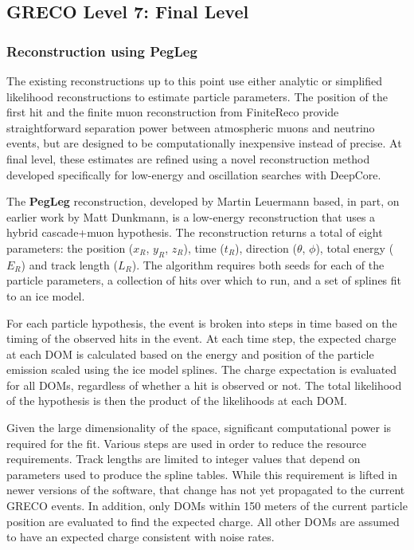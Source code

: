 \subsection{GRECO Level 7: Final Level}

\label{subsec:pegleg_reco}
\subsubsection{Reconstruction using PegLeg}
The existing reconstructions up to this point use either analytic or simplified likelihood reconstructions to estimate particle parameters.
The position of the first hit and the finite muon reconstruction from FiniteReco provide straightforward separation power between atmospheric muons and neutrino events, but are designed to be computationally inexpensive instead of precise.
At final level, these estimates are refined using a novel reconstruction method developed specifically for low-energy and oscillation searches with DeepCore.

The \textbf{PegLeg} reconstruction, developed by Martin Leuermann based, in part, on earlier work by Matt Dunkmann, is a low-energy reconstruction that uses a hybrid cascade+muon hypothesis.
The reconstruction returns a total of eight parameters: the position ($x_R$, $y_R$, $z_R$), time ($t_{R}$), direction ($\theta$, $\phi$), total energy ($E_{R}$) and track length ($L_{R}$). 
The algorithm requires both seeds for each of the particle parameters, a collection of hits over which to run, and a set of splines fit to an ice model.

For each particle hypothesis, the event is broken into steps in time based on the timing of the observed hits in the event.
At each time step, the expected charge at each DOM is calculated based on the energy and position of the particle emission scaled using the ice model splines.
The charge expectation is evaluated for all DOMs, regardless of whether a hit is observed or not.
The total likelihood of the hypothesis is then the product of the likelihoods at each DOM.

Given the large dimensionality of the space, significant computational power is required for the fit.
Various steps are used in order to reduce the resource requirements.
Track lengths are limited to integer values that depend on parameters used to produce the spline tables. 
While this requirement is lifted in newer versions of the software, that change has not yet propagated to the current GRECO events.
In addition, only DOMs within 150 meters of the current particle position are evaluated to find the expected charge.
All other DOMs are assumed to have an expected charge consistent with noise rates.

